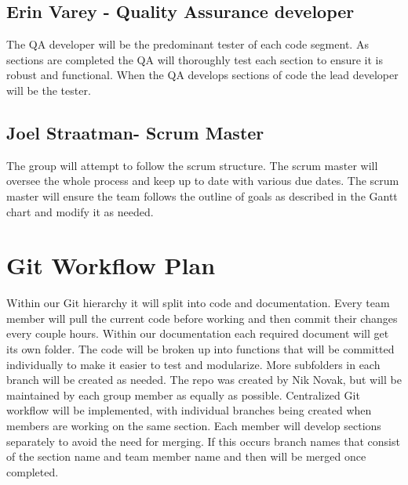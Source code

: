 \documentclass{article}
\begin{document}
\subsection{Erin Varey - Quality Assurance developer}
The QA developer will be the predominant tester of each code segment. As sections are completed the QA will thoroughly test each section to ensure it is robust and functional. When the QA develops sections of code the lead developer will be the tester. 
\subsection{Joel Straatman- Scrum Master}
The group will attempt to follow the scrum structure. The scrum master will oversee the whole process and keep up to date with various due dates. The scrum master will ensure the team follows the outline of goals as described in the Gantt chart and modify it as needed. 
\section{Git Workflow Plan}
Within our Git hierarchy it will split into code and documentation. Every team member will pull the current code before working and then commit their changes every couple hours. Within our documentation each required document will get its own folder. The code will be broken up into functions that will be committed individually to make it easier to test and modularize. More subfolders in each branch will be created as needed. The repo was created by Nik Novak, but will be maintained by each group member as equally as possible. Centralized Git workflow will be implemented, with individual branches being created when members are working on the same section. Each member will develop sections separately to avoid the need for merging. If this occurs branch names that consist of the section name and team member name and then will be merged once completed.
\end{document}
